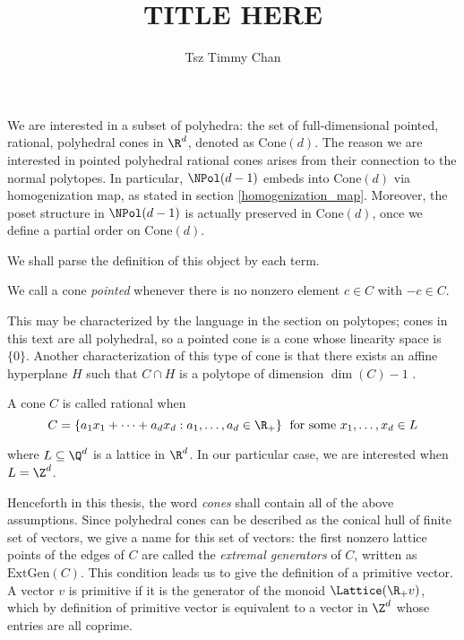 \documentclass{TC}
\title{TITLE HERE}	%
\author{Tsz Timmy Chan}	%
\begin{document}
We are interested in a subset of polyhedra: the set of full-dimensional pointed, rational, polyhedral cones in $\R^d$, denoted as $\mathrm{Cone}(d)$. The reason we are interested in pointed polyhedral rational cones arises from their connection to the normal polytopes. In particular, $\NPol(d-1)$ embeds  into Cone$(d)$ via homogenization map, as stated in section \ref{homogenization_map}. Moreover, the poset structure in $\NPol(d-1)$ is actually preserved in $\mathrm{Cone}(d)$, once we define a partial order on $\mathrm{Cone}(d)$.


We shall parse the definition of this object by each term. 

\begin{definition}
We call a cone \emph{pointed} whenever there is no nonzero element $c \in C$ with $-c \in C$. 
\end{definition}


This may be characterized by the language in the section on polytopes; cones in this text are all polyhedral, so a pointed cone is a cone whose linearity space is $\{0\}$. Another characterization of this type of cone is that there exists an affine hyperplane $H$ such that $C \cap H$ is a polytope of dimension $\dim(C)-1$ \cite{GubeladzePolytopesRingsKtheory}. 

\begin{definition} A cone $C$ is called rational when
$$ C = \{a_1 x_1 + \cdots +a_d x_d: a_1,\ldots, a_d \in \R_+\} \; \text{ for some }  x_1,\ldots,x_d \in L$$

where $L \subseteq \Q^d$ is a lattice in $\R^d$. In our particular case, we are interested when $L = \Z^d$.
\end{definition}


Henceforth in this thesis, the word \emph{cones} shall contain all of the above assumptions. Since polyhedral cones can be described as the conical hull of finite set of vectors, we give a name for this set of vectors: the first nonzero lattice points of the edges of $C$ are called the \emph{extremal generators} of $C$, written as $\mathrm{ExtGen}(C)$. This condition leads us to give the definition of a primitive vector. A vector $v$ is primitive if it is the generator of the monoid $\Lattice(\R_+ v)$, which by definition of primitive vector is equivalent to a vector in $\Z^d$ whose entries are all coprime.
\end{document}
